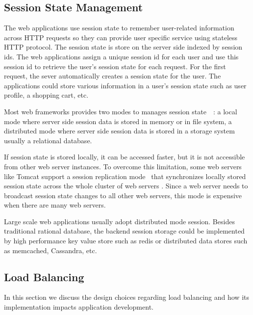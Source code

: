 

\subsection{Session State Management}

The web applications use session state to remember user-related information across HTTP requests
so they can provide user specific service using stateless HTTP protocol.
The session state is store on the server side indexed by session ids.
The web applications assign a unique session id for each user and 
use this session id to retrieve the user's session state for each request.
For the first request, the sever automatically creates a session state for the user.
The applications could store various information in a user's session state
such as user profile, a shopping cart, etc.

Most web frameworks provides two modes to manages session
state~\cite{j2eedoc}~\cite{phpdoc}: a local mode where server side session
data is stored in memory or in file system, a distributed mode where server
side session data is stored in a storage system usually a relational database.

If session state is stored locally, it can be accessed faster, but it is not
accessible from other web server instances.  To overcome this limitation, some
web servers like Tomcat support a session replication
mode~\cite{tomcatcluster} that  synchronizes locally stored session state
across the whole cluster of web servers . Since a web server needs to
broadcast session state changes to all other web servers,  this mode is
expensive when there are many web servers.

Large scale web applications usually adopt distributed mode session.
Besides traditional rational database,
the backend session storage could be implemented by high performance key value
store such as redis or distributed data stores such as memcached, Cassandra, etc.


\subsection{Load Balancing}

In this section we discuss the design choices regarding load balancing and how
its implementation impacts application development.

